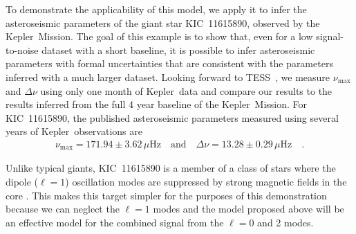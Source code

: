 \documentclass[manuscript, letterpaper]{aastex6}
\newcommand{\project}[1]{\textsf{#1}}
\newcommand{\kepler}{\project{Kepler}}
\newcommand{\tess}{\project{TESS}}
\begin{document}
To demonstrate the applicability of this model, we apply it to infer the
asteroseismic parameters of the giant star KIC~11615890, observed by the
\kepler\ Mission.
The goal of this example is to show that, even for a low signal-to-noise
dataset with a short baseline, it is possible to infer asteroseismic
parameters with formal uncertainties that are consistent with the parameters
inferred with a much larger dataset.
Looking forward to \tess\ \citep{Ricker:2014,Campante:2016}, we measure
$\nu_\mathrm{max}$ and $\Delta\nu$ using only one month of \kepler\ data and
compare our results to the results inferred from the full 4 year baseline of
the \kepler\ Mission.
For KIC~11615890, the published asteroseismic parameters measured using several
years of \kepler\ observations are \citep{Pinsonneault:2014}
\begin{eqnarray}
    \nu_\mathrm{max} = 171.94 \pm 3.62 \,\mu\mathrm{Hz} \quad\mathrm{and}\quad
    \Delta\nu = 13.28 \pm 0.29 \,\mu\mathrm{Hz} \quad.
\end{eqnarray}

Unlike typical giants, KIC~11615890 is a member of a class of stars where the
dipole ($\ell = 1$) oscillation modes are suppressed by strong magnetic fields
in the core \citep{Stello:2016}.
This makes this target simpler for the purposes of this demonstration because
we can neglect the $\ell = 1$ modes and the model proposed above will be an
effective model for the combined signal from the $\ell = 0$ and 2 modes.
\end{document}
